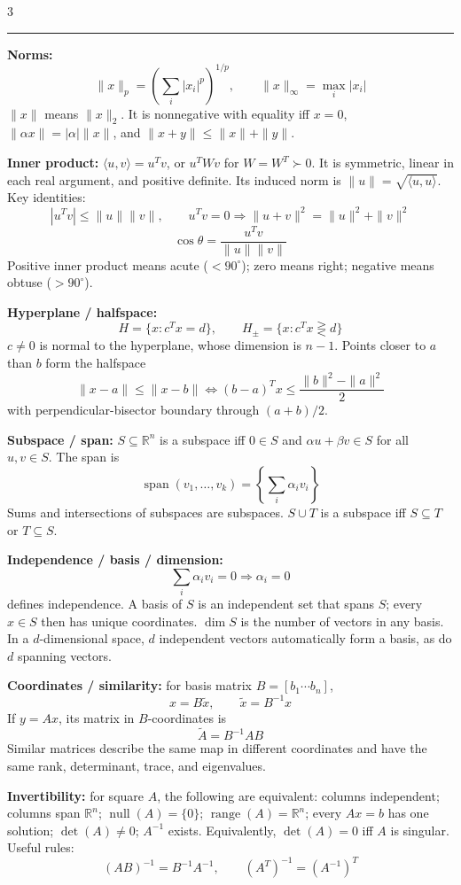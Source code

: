 \documentclass[10pt]{article}
\newcommand{\sect}[1]{\vspace{0.9pt}{\fontsize{7.2}{7.5}\selectfont\textbf{#1}}\vspace{0.25pt}\hrule\vspace{0.8pt}}
\newcommand{\sub}[1]{\textbf{#1}}
\newcommand{\R}{\mathbb{R}}
\newcommand{\range}{\operatorname{range}}
\newcommand{\nullsp}{\operatorname{null}}
\newcommand{\spn}{\operatorname{span}}
\begin{document}
\begin{multicols*}{3}
\sect{Linear Algebra (Lecture 5)}
\sub{Norms:}
\[
\|x\|_p=\left(\sum_i|x_i|^p\right)^{1/p},\qquad
\|x\|_\infty=\max_i|x_i|
\]
\(\|x\|\) means \(\|x\|_2\). It is nonnegative with equality iff \(x=0\),
\(\|\alpha x\|=|\alpha|\|x\|\), and
\(\|x+y\|\le\|x\|+\|y\|\).

\sub{Inner product:} \(\langle u,v\rangle=u^Tv\), or
\(u^TWv\) for \(W=W^T\succ0\). It is symmetric, linear in each real
argument, and positive definite. Its induced norm is
\(\|u\|=\sqrt{\langle u,u\rangle}\). Key identities:
\[
|u^Tv|\le\|u\|\|v\|,\qquad
u^Tv=0\Rightarrow\|u+v\|^2=\|u\|^2+\|v\|^2
\]
\[
\cos\theta=\frac{u^Tv}{\|u\|\|v\|}
\]
Positive inner product means acute (\(<90^\circ\)); zero means right;
negative means obtuse (\(>90^\circ\)).

\sub{Hyperplane / halfspace:}
\[
H=\{x:c^Tx=d\},\qquad
H_\pm=\{x:c^Tx\gtreqless d\}
\]
\(c\ne0\) is normal to the hyperplane, whose dimension is \(n-1\).
Points closer to \(a\) than \(b\) form the halfspace
\[
\|x-a\|\le\|x-b\|
\iff
(b-a)^Tx\le\frac{\|b\|^2-\|a\|^2}{2}
\]
with perpendicular-bisector boundary through \((a+b)/2\).

\sub{Subspace / span:} \(S\subseteq\R^n\) is a subspace iff \(0\in S\)
and \(\alpha u+\beta v\in S\) for all \(u,v\in S\). The span is
\[
\spn(v_1,\ldots,v_k)=\left\{\sum_i\alpha_iv_i\right\}
\]
Sums and intersections of subspaces are subspaces. \(S\cup T\) is a
subspace iff \(S\subseteq T\) or \(T\subseteq S\).

\sub{Independence / basis / dimension:}
\[
\sum_i\alpha_iv_i=0\Rightarrow\alpha_i=0
\]
defines independence. A basis of \(S\) is an independent set that spans
\(S\); every \(x\in S\) then has unique coordinates. \(\dim S\) is the
number of vectors in any basis. In a \(d\)-dimensional space, \(d\)
independent vectors automatically form a basis, as do \(d\) spanning
vectors.

\sub{Coordinates / similarity:} for basis matrix
\(B=[b_1\cdots b_n]\),
\[
x=B\tilde x,\qquad \tilde x=B^{-1}x
\]
If \(y=Ax\), its matrix in \(B\)-coordinates is
\[
\tilde A=B^{-1}AB
\]
Similar matrices describe the same map in different coordinates and have
the same rank, determinant, trace, and eigenvalues.

\sub{Invertibility:} for square \(A\), the following are equivalent:
columns independent; columns span \(\R^n\); \(\nullsp(A)=\{0\}\);
\(\range(A)=\R^n\); every \(Ax=b\) has one solution; \(\det(A)\ne0\);
\(A^{-1}\) exists. Equivalently, \(\det(A)=0\) iff \(A\) is singular.
Useful rules:
\[
(AB)^{-1}=B^{-1}A^{-1},\qquad (A^T)^{-1}=(A^{-1})^T
\]


\end{multicols*}
\end{document}
